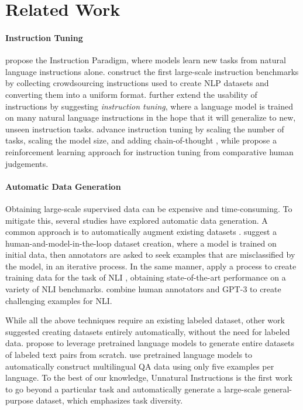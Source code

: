 \section{Related Work}

\paragraph{Instruction Tuning}
\citet{turkingtest} propose the Instruction Paradigm, where models learn new tasks from natural language instructions alone. \citet{mishra-etal-2022-cross, supernaturalinstructions} construct the first large-scale instruction benchmarks by collecting crowdsourcing instructions used to create NLP datasets and converting them into a uniform format.
\citet{sanh2021multitask, wei2021finetuned} further extend the usability of instructions by suggesting \textit{instruction tuning}, where a language model is trained on many natural language instructions in the hope that it will generalize to new, unseen instruction tasks. \citet{flampalm} advance instruction tuning by scaling the number of tasks, scaling the model size, and adding chain-of-thought \citep{wei2022chain}, while \citet{instructgpt} propose a reinforcement learning approach for instruction tuning from comparative human judgements.

\paragraph{Automatic Data Generation} Obtaining large-scale supervised data can be expensive and time-consuming. To mitigate this, several studies have explored automatic data generation. A common approach is to automatically augment existing datasets  \citep[\textit{inter alia}]{AnabyTavor2020DoNH, andreas-2020-good, yang-etal-2020-generative, Kaushik2020Learning, lee2021neural}. \citet{kiela-etal-2021-dynabench} suggest a human-and-model-in-the-loop dataset creation, where a model is trained on initial data, then annotators are asked to seek examples that are misclassified by the model, in an iterative process. In the same manner, \citet{nie-etal-2020-adversarial} apply a process to create training data for the task of NLI \citep{dagan-pascal-2003, bowman-etal-2015-large}, obtaining state-of-the-art performance on a variety of NLI benchmarks. 
\citet{liu-etal-2022-wanli} combine human annotators and GPT-3 to create challenging examples for NLI.

While all the above techniques require an existing labeled dataset, other work suggested creating datasets entirely automatically, without the need for labeled data. \citet{schick-schutze-2021-generating} propose to leverage pretrained language models to generate entire datasets of labeled text pairs from scratch. \citet{agrawal2022qameleon} use pretrained language models to automatically construct multilingual QA data using only five examples per language. To the best of our knowledge, Unnatural Instructions is the first work to go beyond a particular task and automatically generate a large-scale general-purpose dataset, which emphasizes task diversity.

